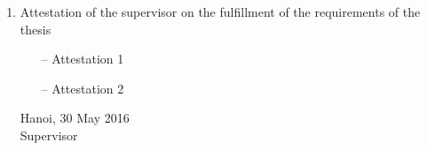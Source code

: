 \begin{requirement}
\begin{enumerate}[leftmargin=*]
	\item Attestation of the supervisor on the fulfillment of the requirements of the thesis
		\begin{itemize}
			\item[--] Attestation 1
			\item[--] Attestation 2
		\end{itemize}
		\begin{flushright}
			\begin{minipage}{0.5\linewidth}
				\centering
				Hanoi, 30 May 2016\\
				Supervisor\\
				\vspace{30pt}
				\supervisor
			\end{minipage}	
		\end{flushright}
\end{enumerate}
\end{requirement}